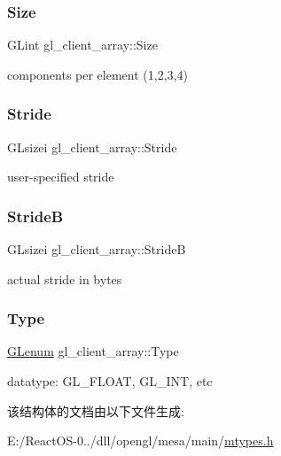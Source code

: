 \subsubsection{\texorpdfstring{Size}{Size}}
{\footnotesize\ttfamily G\+Lint gl\+\_\+client\+\_\+array\+::\+Size}

components per element (1,2,3,4) \mbox{\label{structgl__client__array_a0f60f949150b164168a786a75a75c282}} 
\subsubsection{\texorpdfstring{Stride}{Stride}}
{\footnotesize\ttfamily G\+Lsizei gl\+\_\+client\+\_\+array\+::\+Stride}

user-\/specified stride \mbox{\label{structgl__client__array_a30ed459ae4889930d0bc2bfa8a993cd2}} 
\subsubsection{\texorpdfstring{StrideB}{StrideB}}
{\footnotesize\ttfamily G\+Lsizei gl\+\_\+client\+\_\+array\+::\+StrideB}

actual stride in bytes \mbox{\label{structgl__client__array_acdceb166f57a7d950def8ab213a0df06}} 
\subsubsection{\texorpdfstring{Type}{Type}}
{\footnotesize\ttfamily \hyperlink{interfacevoid}{G\+Lenum} gl\+\_\+client\+\_\+array\+::\+Type}

datatype\+: G\+L\+\_\+\+F\+L\+O\+AT, G\+L\+\_\+\+I\+NT, etc 

该结构体的文档由以下文件生成\+:\begin{DoxyCompactItemize}
\item 
E\+:/\+React\+O\+S-\/0../dll/opengl/mesa/main/\hyperlink{mtypes_8h}{mtypes.\+h}\end{DoxyCompactItemize}
